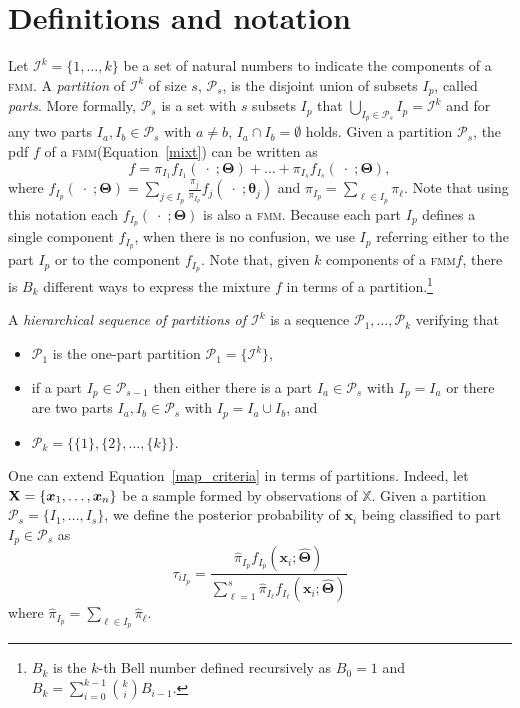 \documentclass[submit]{smj}
\theoremstyle{definition}
\newcommand{\m}[1]{\boldsymbol{#1}}
\newcommand{\fmm}{\textsc{fmm}\xspace}
\newcommand{\X}{\text{\textbf{X}}}
\begin{document}
\section{Definitions and notation}\label{definitions}

%
Let $\mathcal{I}^k = \{1, \dots, k\}$ be a set of natural numbers to indicate the components of a \fmm. A \emph{partition} of $\mathcal{I}^k$ of size $s$, $\mathcal{P}_s$, is the disjoint union of subsets $I_p$, called \emph{parts}. More formally, $\mathcal{P}_s$ is a set with $s$ subsets $I_p$  that $\bigcup_{I_p \in \mathcal{P}_s} I_p = \mathcal{I}^k$ and for any two parts $I_a, I_b \in \mathcal{P}_s$ with $a \neq b$, $I_a \cap I_b = \emptyset$ holds. Given a partition  $\mathcal{P}_s$, the pdf $f$ of a \fmm (Equation~\ref{mixt}) can be written as
\begin{equation}
f = \pi_{I_1} f_{I_1}(\;\cdot\;; \m\Theta) + \dots + \pi_{I_s} f_{I_s}(\;\cdot\;; \m\Theta),
\label{mixt_part}
\end{equation}
where $f_{I_p}(\;\cdot\;;  \m\Theta) = \sum_{j \in I_p} \frac{\pi_j}{\pi_{I_p}} f_j(\;\cdot\; ; \m\theta_j)$ and $\pi_{I_p} = \sum_{\ell \in I_p} \pi_\ell$. Note that using this notation each $f_{I_p}(\;\cdot\;;  \m\Theta)$ is also a \fmm. Because each part $I_p$ defines a single component $f_{I_p}$, when there is no confusion, we use $I_p$ referring either to the part $I_p$ or to the component $f_{I_p}$. Note that, given $k$ components of a \fmm $f$, there is $B_k$ different ways to express the mixture  $f$ in terms of a partition.\footnote{$B_k$ is the $k$-th Bell number defined recursively as $B_0 = 1$ and $B_k = \sum_{i=0}^{k-1} \binom ki B_{i-1}$.}



A \emph{hierarchical sequence of partitions of $\mathcal{I}^k$} is a sequence $\mathcal{P}_1, \dots, \mathcal{P}_k$ verifying that
\begin{itemize}
\item $\mathcal{P}_1$ is the one-part partition $\mathcal{P}_1 = \{ \mathcal{I}^k \}$,
\item if a part $I_p \in \mathcal{P}_{s-1}$ then either there is a part $I_a \in \mathcal{P}_{s}$ with $I_p = I_a$ or there are two parts $I_a, I_b \in \mathcal{P}_s$ with $I_p = I_a \cup I_b$, and
\item $\mathcal{P}_k= \{ \{1\},\{2\}, \dots, \{k\} \}$.
\end{itemize}



One can extend Equation~\ref{map_criteria} in terms of partitions. Indeed, let $\X = \{\m x_1,\dots, \m x_n\}$ be a sample formed by observations of $\mathbb{X}$. Given a partition $\mathcal{P}_s = \{ I_1, \dots, I_s \}$, we define the posterior probability of $\m x_i$ being classified to part $I_p\in \mathcal{P}_{s}$ as
\[
\tau_{i I_p} =  \frac{ \hat{\pi}_{I_p} f_{I_p}(\m x_i; \hat{\m\Theta}) }{\sum_{\ell=1}^s \hat{\pi}_{I_\ell} f_{I_\ell}(\m x_i; \hat{\m\Theta})}
\]
where $\hat{\pi}_{I_p} = \sum_{\ell \in I_p} \hat{\pi}_\ell$.
\end{document}
